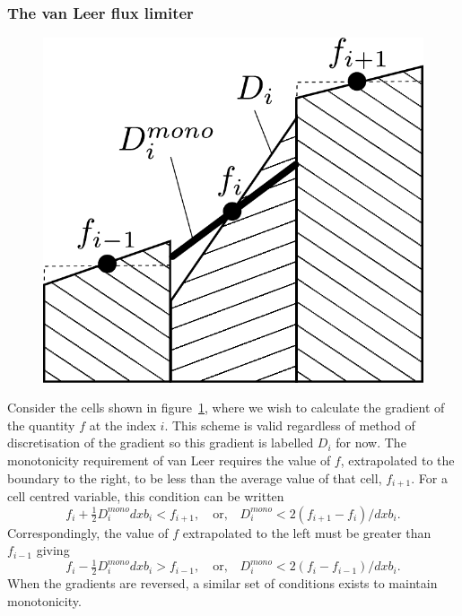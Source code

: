 \subsubsection{The van Leer flux limiter}

\begin{figure}[t]
  \centering
  \includegraphics[width=0.4\linewidth]{van_leer_flux_limiter}
  \label{fig:van_leer_flux_limiter}
\end{figure}

Consider the cells shown in figure~\ref{fig:van_leer_flux_limiter}, where we wish to calculate the gradient of the quantity $f$ at the index $i$. This scheme is valid regardless of method of discretisation of the gradient so this gradient is labelled $D_i$ for now. The monotonicity requirement of van Leer requires the value of $f$, extrapolated to the boundary to the right, to be less than the average value of that cell, $f_{i+1}$. For a cell centred variable, this condition can be written
\begin{equation}
  \label{eq:flux_limiter1}
f_i + \tfrac{1}{2}D_i^{mono} dxb_i < f_{i+1}, \quad \text{or,} \quad D_i^{mono} < 2 (f_{i+1} - f_i) / dxb_i.
\end{equation}
Correspondingly, the value of $f$ extrapolated to the left must be greater than $f_{i-1}$ giving
\begin{equation}
  \label{eq:flux_limiter2}
f_i - \tfrac{1}{2}D_i^{mono} dxb_i > f_{i-1}, \quad \text{or,} \quad D_i^{mono} < 2 (f_{i} - f_{i-1}) / dxb_i.
\end{equation}
When the gradients are reversed, a similar set of conditions exists to maintain monotonicity.

